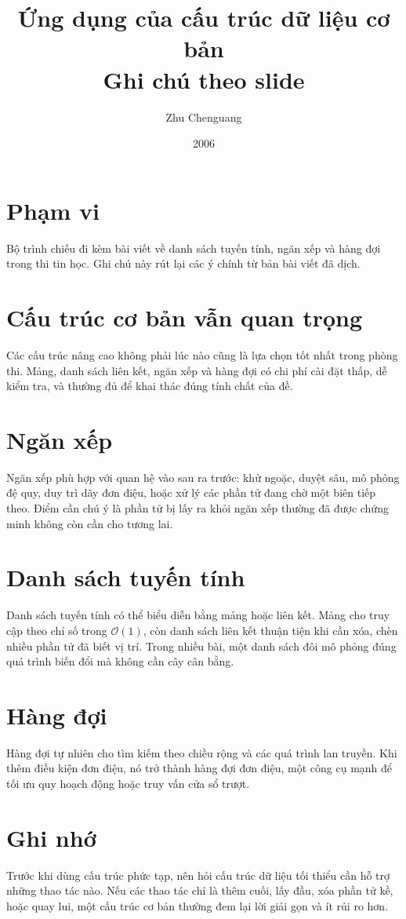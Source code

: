 \documentclass[11pt]{article}
\title{Ứng dụng của cấu trúc dữ liệu cơ bản\\{\large Ghi chú theo slide}}
\author{Zhu Chenguang}
\date{2006}
\newcommand{\Oh}{\mathcal{O}}
\begin{document}
\maketitle


\section{Phạm vi}

Bộ trình chiếu đi kèm bài viết về danh sách tuyến tính, ngăn xếp và hàng đợi
trong thi tin học. Ghi chú này rút lại các ý chính từ bản bài viết đã dịch.

\section{Cấu trúc cơ bản vẫn quan trọng}

Các cấu trúc nâng cao không phải lúc nào cũng là lựa chọn tốt nhất trong phòng
thi. Mảng, danh sách liên kết, ngăn xếp và hàng đợi có chi phí cài đặt thấp,
dễ kiểm tra, và thường đủ để khai thác đúng tính chất của đề.

\section{Ngăn xếp}

Ngăn xếp phù hợp với quan hệ vào sau ra trước: khử ngoặc, duyệt sâu, mô phỏng
đệ quy, duy trì dãy đơn điệu, hoặc xử lý các phần tử đang chờ một biên tiếp
theo. Điểm cần chú ý là phần tử bị lấy ra khỏi ngăn xếp thường đã được chứng
minh không còn cần cho tương lai.

\section{Danh sách tuyến tính}

Danh sách tuyến tính có thể biểu diễn bằng mảng hoặc liên kết. Mảng cho truy
cập theo chỉ số trong \(\Oh(1)\), còn danh sách liên kết thuận tiện khi cần
xóa, chèn nhiều phần tử đã biết vị trí. Trong nhiều bài, một danh sách đôi mô
phỏng đúng quá trình biến đổi mà không cần cây cân bằng.

\section{Hàng đợi}

Hàng đợi tự nhiên cho tìm kiếm theo chiều rộng và các quá trình lan truyền.
Khi thêm điều kiện đơn điệu, nó trở thành hàng đợi đơn điệu, một công cụ mạnh
để tối ưu quy hoạch động hoặc truy vấn cửa sổ trượt.

\section{Ghi nhớ}

Trước khi dùng cấu trúc phức tạp, nên hỏi cấu trúc dữ liệu tối thiểu cần hỗ
trợ những thao tác nào. Nếu các thao tác chỉ là thêm cuối, lấy đầu, xóa phần
tử kề, hoặc quay lui, một cấu trúc cơ bản thường đem lại lời giải gọn và ít
rủi ro hơn.
\end{document}
